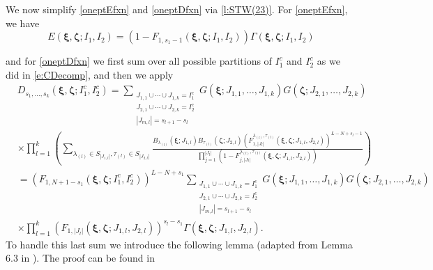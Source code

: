 \documentclass[a4paper,11pt]{article}
\theoremstyle{definition}
\begin{document}
We now simplify \eqref{oneptEfxn} and \eqref{oneptDfxn} via \eqref{l:STW(23)}. For \eqref{oneptEfxn}, we have
\begin{equation}
    E(\boldsymbol{\xi},\boldsymbol{\zeta};I_1, I_2)=(1-F_{1,s_1-1}(\boldsymbol{\xi},\boldsymbol{\zeta};I_1, I_2))\Gamma(\boldsymbol{\xi},\boldsymbol{\zeta};I_1, I_2)
\end{equation}

and for \eqref{oneptDfxn} we first sum over all possible partitions of $I_1^c$ and $I_2^c$ as we did in \eqref{e:CDecomp}, and then we apply 
\begin{equation}\label{e:DsDecomp}
\begin{split}
    &D_{s_1,\ldots,s_k}(\boldsymbol{\xi},\boldsymbol{\zeta};I_1^c, I_2^c)=\sum_{\substack{J_{1,1}\cup\cdots\cup J_{1,k} = I_1^c \\J_{2,1}\cup\cdots\cup J_{2,k} = I_2^c \\
    |J_{m, l}|=s_{l+1}-s_l}}G(\boldsymbol{\xi};J_{1,1},\ldots,J_{1,k})G(\boldsymbol{\zeta};J_{2,1},\ldots,J_{2,k})\\
    &\times \prod_{l=1}^k\left( \sum_{\lambda_{(l)}\in S_{|J_{1,l}|}, \tau_{(l)} \in S_{|J_{2,l}|}}\frac{B_{\lambda_{(l)}}(\boldsymbol{\xi};J_{1,l})B_{\tau_{(l)}}(\boldsymbol{\zeta};J_{2,l})\left(F_{1,|J_l|}^{\lambda_{(l)},\tau_{(l)}}(\boldsymbol{\xi},\boldsymbol{\zeta};J_{1,l}, J_{2, l}) \right)^{L-N+s_l-1}}{\prod_{j=1}^{|J_l|}\left(1-F_{j,|J_l|}^{\lambda_{(l)},\tau_{(l)}}(\boldsymbol{\xi},\boldsymbol{\zeta};J_{1, l}, J_{2,l}) \right)}  \right) \\
    &= \left(F_{1,N+1-s_1}(\boldsymbol{\xi},\boldsymbol{\zeta};I_1^c, I_2^c) \right)^{L-N+s_1}\sum_{\substack{J_{1,1}\cup\cdots\cup J_{1,k} = I_1^c \\J_{2,1}\cup\cdots\cup J_{2,k} = I_2^c \\
    |J_{m, l}|=s_{l+1}-s_l}}G(\boldsymbol{\xi};J_{1,1},\ldots,J_{1,k})G(\boldsymbol{\zeta};J_{2,1},\ldots,J_{2,k})\\
    &\times \prod_{l=1}^k\left(F_{1,|J_l|}(\boldsymbol{\xi},\boldsymbol{\zeta};J_{1,l}, J_{2,l}) \right)^{s_l-s_1}\Gamma(\boldsymbol{\xi},\boldsymbol{\zeta};J_{1,l}, J_{2,l}).
\end{split}
\end{equation}
To handle this last sum we introduce the following lemma (adapted from Lemma 6.3 in \cite{liu_integral_2020}). The proof can be found in  
\end{document}
